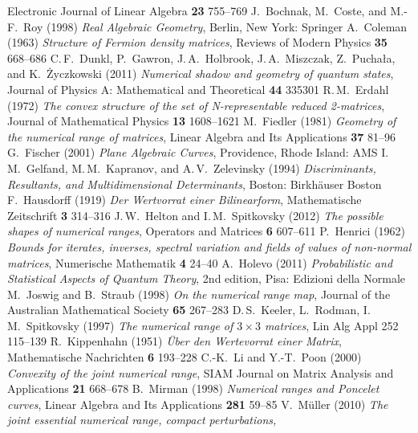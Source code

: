 \documentclass[12pt]{amsart}
\theoremstyle{definition}
\numberwithin{equation}{section}
\begin{document}
\begin{thebibliography}{10}
Electronic Journal of Linear Algebra {\bf 23} 755--769
 J.~Bochnak, M.~Coste, and M.-F.~Roy (1998)
{\em Real Algebraic Geometry}, 
Berlin, New York: Springer
 A.~Coleman (1963)
{\em Structure of Fermion density matrices}, 
Reviews of Modern Physics {\bf 35} 668--686
 C.\,F.~Dunkl, P.~Gawron, J.\,A.~Holbrook, 
J.\,A.~Miszczak, Z.~Pucha{\l}a, and K.~{\.Z}yczkowski (2011)
{\em Numerical shadow and geometry of quantum states},
Journal of Physics A: Mathematical and Theoretical {\bf 44} 335301
 R.\,M.~Erdahl (1972)
{\em The convex structure of the set of N-representable reduced 2-matrices}, 
Journal of Mathematical Physics {\bf 13} 1608--1621
 M.~Fiedler (1981)
{\em Geometry of the numerical range of matrices}, 
Linear Algebra and Its Applications {\bf 37} 81--96
 G.~Fischer (2001)
{\em Plane Algebraic Curves}, Providence, Rhode Island: AMS
 I.\,M.~Gelfand, M.\,M.~Kapranov, and
A.\,V.~Zelevinsky (1994)
{\em Discriminants, Resultants, and Multidimensional Determinants},
Boston: Birkh\"auser Boston
 F.~Hausdorff (1919)
{\em Der Wertvorrat einer Bilinearform},
Mathematische Zeitschrift {\bf 3} 314--316
 J.\,W.~Helton and I.\,M.~Spitkovsky (2012)
{\em The possible shapes of numerical ranges},
Operators and Matrices {\bf 6} 607--611
 P.~Henrici (1962)
{\em Bounds for iterates, inverses, spectral variation and fields of values 
of non-normal matrices}, 
Numerische Mathematik {\bf 4} 24--40
 A.~Holevo (2011)
{\em Probabilistic and Statistical Aspects of Quantum Theory}, 
2nd edition, Pisa: Edizioni della Normale
 M.~Joswig and B.~Straub (1998)
{\em On the numerical range map}, 
Journal of the Australian Mathematical Society {\bf 65} 267--283
 D.\,S.~Keeler, L.~Rodman,
I.\,M.~Spitkovsky (1997)
{\em The numerical range of $3\times 3$ matrices},
Lin Alg Appl 252 115--139
 R.~Kippenhahn (1951) 
{\em \"Uber den Wertevorrat einer Matrix},
Mathematische Nachrichten {\bf 6} 193--228
 C.-K.~Li and Y.-T.~Poon (2000)
{\em Convexity of the joint numerical range}, 
SIAM Journal on Matrix Analysis and Applications {\bf 21} 668--678
 B.~Mirman (1998)
{\em Numerical ranges and Poncelet curves}, 
Linear Algebra and Its Applications {\bf 281} 59--85
 V.~M\"uller (2010) 
{\em The joint essential numerical range, compact perturbations, 
}
\end{thebibliography}
\end{document}
